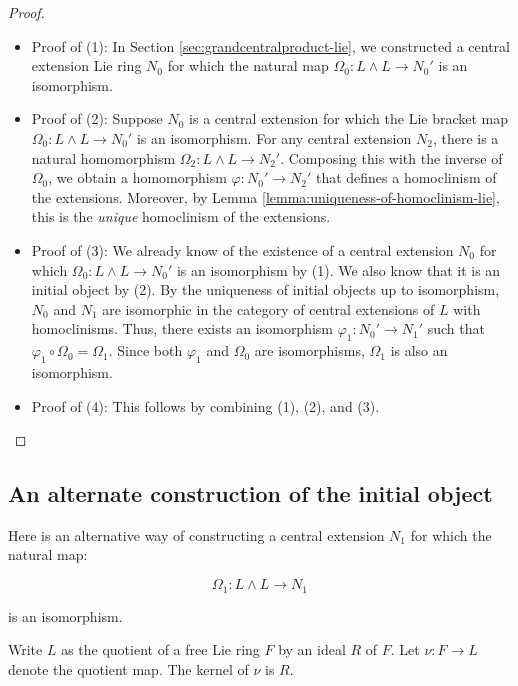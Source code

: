 \documentclass{ucetd}
\begin{document}
\begin{proof}
  \begin{itemize}
  \item Proof of (1): In Section \ref{sec:grandcentralproduct-lie}, we
    constructed a central extension Lie ring $N_0$ for which the natural
    map $\Omega_0: L \wedge L \to N_0'$ is an isomorphism.

  \item Proof of (2): Suppose $N_0$ is a central extension for which
    the Lie bracket map $\Omega_0:L \wedge L \to N_0'$ is an
    isomorphism. For any central extension $N_2$, there is a natural
    homomorphism $\Omega_2: L \wedge L \to N_2'$. Composing this with
    the inverse of $\Omega_0$, we obtain a homomorphism
    $\varphi:N_0' \to N_2'$ that defines a homoclinism of the
    extensions. Moreover, by Lemma
    \ref{lemma:uniqueness-of-homoclinism-lie}, this is the {\em unique}
    homoclinism of the extensions.

  \item Proof of (3): We already know of the existence of a central
    extension $N_0$ for which $\Omega_0:L \wedge L \to N_0'$ is
    an isomorphism by (1). We also know that it is an initial object
    by (2). By the uniqueness of initial objects up to isomorphism,
    $N_0$ and $N_1$ are isomorphic in the category of central
    extensions of $L$ with homoclinisms. Thus, there exists an
    isomorphism $\varphi_1:N_0' \to N_1'$ such that $\varphi_1 \circ
    \Omega_0 = \Omega_1$. Since both $\varphi_1$ and $\Omega_0$ are
    isomorphisms, $\Omega_1$ is also an isomorphism.

  \item Proof of (4): This follows by combining (1), (2), and (3).
  \end{itemize}
\end{proof}

\subsection{An alternate construction of the initial object}\label{sec:freeinitialobject-lie}

Here is an alternative way of constructing a central extension $N_1$ for which the natural map:

$$\Omega_1:L \wedge L \to N_1$$

is an isomorphism.

Write $L$ as the quotient of a free Lie ring $F$ by an ideal $R$ of
$F$. Let $\nu:F \to L$ denote the quotient map. The kernel of $\nu$ is
$R$.
\end{document}
